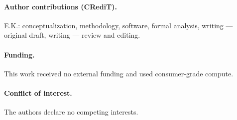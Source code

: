 \paragraph{Author contributions (CRediT).} E.K.: conceptualization, methodology, software,
formal analysis, writing --- original draft, writing --- review and editing.

\paragraph{Funding.} This work received no external funding and used consumer-grade compute.

\paragraph{Conflict of interest.} The authors declare no competing interests.

